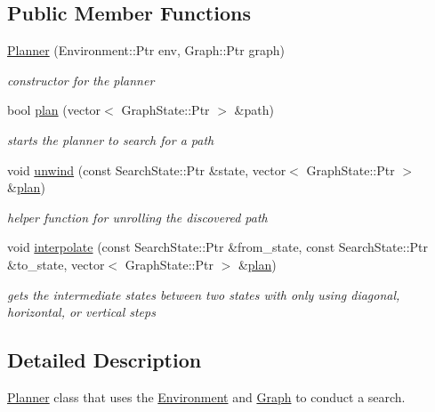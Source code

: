 \subsection*{\-Public \-Member \-Functions}
\begin{DoxyCompactItemize}
\item 
\hyperlink{class_planner_ab7ced6e144f0ca732c59e1e34de2382b}{\-Planner} (\-Environment\-::\-Ptr env, \-Graph\-::\-Ptr graph)
\begin{DoxyCompactList}\small\item\em constructor for the planner \end{DoxyCompactList}\item 
bool \hyperlink{class_planner_ae4fa0f802bd7a15d6d95ce06edb409ac}{plan} (vector$<$ \-Graph\-State\-::\-Ptr $>$ \&path)
\begin{DoxyCompactList}\small\item\em starts the planner to search for a path \end{DoxyCompactList}\item 
void \hyperlink{class_planner_aa054eca4b15676cc7e3d334e6bae5609}{unwind} (const \-Search\-State\-::\-Ptr \&state, vector$<$ \-Graph\-State\-::\-Ptr $>$ \&\hyperlink{class_planner_ae4fa0f802bd7a15d6d95ce06edb409ac}{plan})
\begin{DoxyCompactList}\small\item\em helper function for unrolling the discovered path \end{DoxyCompactList}\item 
void \hyperlink{class_planner_a233641a9be15517565338788ba5e8bfc}{interpolate} (const \-Search\-State\-::\-Ptr \&from\-\_\-state, const \-Search\-State\-::\-Ptr \&to\-\_\-state, vector$<$ \-Graph\-State\-::\-Ptr $>$ \&\hyperlink{class_planner_ae4fa0f802bd7a15d6d95ce06edb409ac}{plan})
\begin{DoxyCompactList}\small\item\em gets the intermediate states between two states with only using diagonal, horizontal, or vertical steps \end{DoxyCompactList}\end{DoxyCompactItemize}


\subsection{\-Detailed \-Description}
\hyperlink{class_planner}{\-Planner} class that uses the \hyperlink{class_environment}{\-Environment} and \hyperlink{class_graph}{\-Graph} to conduct a search. 

